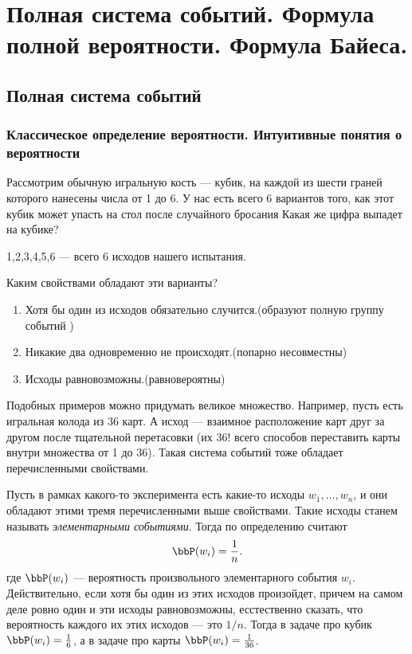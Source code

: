\chapter{Полная система событий. Формула полной вероятности. Формула Байеса.}
\section{Полная система событий}

\subsection{Классическое определение вероятности. Интуитивные понятия о вероятности}

Рассмотрим обычную игральную кость --- кубик, на каждой из шести граней которого нанесены числа от 1 до 6. У нас есть всего 6 вариантов того, как этот кубик может упасть на стол после случайного бросания Какая же цифра выпадет на кубике? 
\begin{center}
1,2,3,4,5,6 --- всего 6 исходов нашего испытания.
\end{center}
Каким свойствами обладают эти варианты?
\begin{enumerate}
\item Хотя бы один из исходов обязательно случится.(образуют полную группу событий )
\item Никакие два одновременно не происходят.(попарно несовместны)
\item Исходы равновозможны.(равновероятны)
\end{enumerate}

Подобных примеров можно придумать великое множество. Например, пусть есть игральная колода из 36 карт. А исход --- взаимное расположение карт друг за другом после тщательной перетасовки (их 36! всего способов переставить карты внутри множества от 1 до 36). Такая система событий тоже обладает перечисленными свойствами.

Пусть в рамках какого-то эксперимента есть какие-то исходы $w_1, \dots,w_n$, и они обладают этими тремя перечисленными выше свойствами. Такие исходы станем называть \textit{элементарными событиями}. Тогда по определению считают
$$
\bbP(w_i)=\frac{1}{n}.
$$
где $\bbP(w_i)$ --- вероятность произвольного элементарного события $w_i$. Действительно, если хотя бы один из этих исходов произойдет, причем на самом деле ровно один и эти исходы равновозможны, есстественно сказать, что вероятность каждого их этих исходов --- это $1/n$. Тогда в задаче про кубик $\bbP(w_i) =\frac{1}{6}$, а в задаче про карты $\bbP(w_i) = \frac{1}{36}$.


